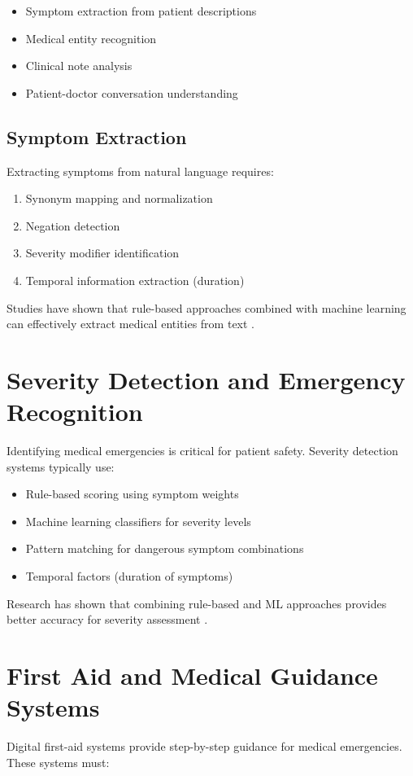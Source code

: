 \begin{itemize}
    \item Symptom extraction from patient descriptions
    \item Medical entity recognition
    \item Clinical note analysis
    \item Patient-doctor conversation understanding
\end{itemize}

\subsection{Symptom Extraction}
Extracting symptoms from natural language requires:
\begin{enumerate}
    \item Synonym mapping and normalization
    \item Negation detection
    \item Severity modifier identification
    \item Temporal information extraction (duration)
\end{enumerate}

Studies have shown that rule-based approaches combined with machine learning can effectively extract medical entities from text \cite{wang2018clinical}.

\section{Severity Detection and Emergency Recognition}
Identifying medical emergencies is critical for patient safety. Severity detection systems typically use:

\begin{itemize}
    \item Rule-based scoring using symptom weights
    \item Machine learning classifiers for severity levels
    \item Pattern matching for dangerous symptom combinations
    \item Temporal factors (duration of symptoms)
\end{itemize}

Research has shown that combining rule-based and ML approaches provides better accuracy for severity assessment \cite{liu2019emergency}.

\section{First Aid and Medical Guidance Systems}
Digital first-aid systems provide step-by-step guidance for medical emergencies. These systems must:

